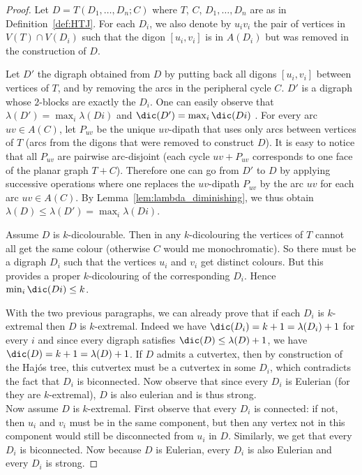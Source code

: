 \begin{proof}
Let $D=T(D_1, \dots, D_n;C)$ where $T$, $C$, $D_1, \dots, D_n$ are as in Definition~\ref{def:HTJ}. For each $D_i$, we also denote by $u_iv_i$ the pair of vertices in $V(T)\cap V(D_i)$ such that the digon $[u_i,v_i]$ is in $A(D_i)$ but was removed in the construction of $D$. 

Let  $D'$ the digraph obtained from $D$ by putting back all digons $[u_i,v_i]$ between vertices of $T$, and by removing the arcs in the peripheral cycle $C$. $D'$ is a digraph whose $2$-blocks are exactly the $D_i$. One can easily observe that $\lambda(D')=\max_i \lambda(Di)$ and $\dic(D')=\max_i \dic(Di)$ . For every arc $uv\in A(C)$, let $P_{uv}$ be the unique $uv$-dipath that uses only arcs between vertices of $T$ (arcs from the digons that were removed to construct $D$). It is easy to notice that all $P_{uv}$ are pairwise arc-disjoint (each cycle $uv+P_{uv}$ corresponds to one face of the planar graph $T+C$). Therefore one can go from $D'$ to $D$ by applying successive operations where one replaces the $uv$-dipath $P_{uv}$ by the arc $uv$ for each arc $uv\in A(C)$. By Lemma~\ref{lem:lambda_diminishing}, we thus obtain 
$\lambda(D) \leq \lambda(D')=\max_i \lambda(Di)$.

Assume $D$ is $k$-dicolourable. Then in any $k$-dicolouring the vertices of $T$ cannot all get the same colour (otherwise $C$ would me monochromatic). So there must be a digraph $D_i$ such that the vertices $u_i$ and $v_i$ get distinct colours. But this provides a proper $k$-dicolouring of the corresponding $D_i$. Hence  
$\min_i \dic(Di) \leq k$.

With the two previous paragraphs, we can already prove that if each $D_i$ is $k$-extremal then $D$ is $k$-extremal. Indeed we have $\dic(D_i)=k+1=\lambda(D_i)+1$ for every $i$ and since every digraph satisfies $\dic(D)\leq \lambda(D)+1$, we have $\dic(D)=k+1=\lambda(D)+1$.  If $D$ admits a cutvertex, then by construction of the Haj\'os tree, this cutvertex must be a cutvertex in some $D_i$, which contradicts the fact that $D_i$ is biconnected. Now observe that since every $D_i$ is Eulerian (for they are $k$-extremal), $D$ is also eulerian and is thus strong.\\

Now assume $D$ is $k$-extremal. First observe that every $D_i$ is connected: if not, then $u_i$ and $v_i$ must be in the same component, but then any vertex not in this component would still be disconnected from $u_i$ in $D$. Similarly, we get that every $D_i$ is biconnected. Now because $D$ is Eulerian, every $D_i$ is also Eulerian and every $D_i$ is strong.


\end{proof}

